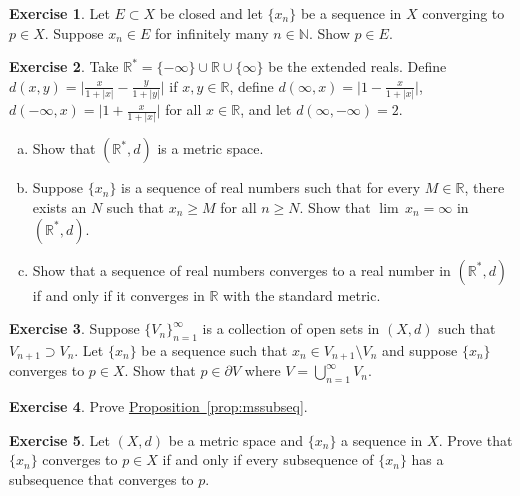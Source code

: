 \documentclass[12pt,openany]{book}
\newcommand{\abs}[1]{\left\lvert {#1} \right\rvert}
\newcommand{\R}{{\mathbb{R}}}
\newcommand{\N}{{\mathbb{N}}}
\theoremstyle{plain}
\theoremstyle{remark}
\theoremstyle{definition}
\newenvironment{exbox}{%
    \def\FrameCommand{\vrule width 1pt \relax\hspace{10pt}}%
    \MakeFramed{\advance\hsize-\width\FrameRestore}%
}{%
    \endMakeFramed
}
\newenvironment{exparts}{%
    \leavevmode\begin{enumerate}[a),noitemsep,topsep=0pt,parsep=0pt,partopsep=0pt]
}{%
    \end{enumerate}
}
\theoremstyle{exercise}
\newtheorem{exercise}{Exercise}[section]
\theoremstyle{example}
\newcommand{\propref}[1]{\hyperref[#1]{Proposition~\ref*{#1}}}
\begin{document}
\begin{exbox}
\begin{exercise}
Let $E \subset X$ be closed and
let $\{ x_n \}$ be a sequence in $X$ converging to $p \in X$.  Suppose
$x_n \in E$ for infinitely many $n \in \N$.  Show $p \in E$.
\end{exercise}

\begin{exercise} \label{exercise:extendedrealsmetric}
Take $\R^* = \{ -\infty \} \cup \R \cup \{ \infty \}$ be the extended reals.
Define $d(x,y) = \bigl\lvert \frac{x}{1+\abs{x}} - \frac{y}{1+\abs{y}}
\bigr\rvert$
if $x, y \in \R$,
define $d(\infty,x) = \bigl\lvert 1 - \frac{x}{1+\abs{x}} \bigr\rvert$,
$d(-\infty,x) = \bigl\lvert 1 + \frac{x}{1+\abs{x}} \bigr\rvert$
for all $x \in \R$, and
let $d(\infty,-\infty) = 2$.
\begin{exparts}
\item
Show that $(\R^*,d)$ is a metric space.
\item
Suppose $\{ x_n \}$ is a sequence of real numbers such that
for every $M \in \R$, there exists an $N$ such that
$x_n \geq M$ for all $n \geq N$.  Show that $\lim\, x_n = \infty$ in
$(\R^*,d)$.
\item
Show that a sequence of real numbers converges to a real number
in $(\R^*,d)$ if and
only if it converges in $\R$ with the standard metric.
\end{exparts}
\end{exercise}

\begin{exercise}
Suppose $\{ V_n \}_{n=1}^\infty$ is a collection of open sets
in $(X,d)$
such that $V_{n+1} \supset V_n$.  Let $\{ x_n \}$ be a sequence
such that $x_n \in V_{n+1} \setminus V_n$ and suppose 
$\{ x_n \}$ converges to $p \in X$.  Show that $p \in \partial V$
where $V = \bigcup_{n=1}^\infty V_n$.
\end{exercise}

\begin{exercise}
Prove \propref{prop:mssubseq}.
\end{exercise}

\begin{exercise}
Let $(X,d)$ be a metric space and $\{ x_n \}$ a sequence in $X$.
Prove that $\{ x_n \}$ converges to $p \in X$
if and only if
every subsequence of $\{ x_n \}$ has a subsequence that
converges to $p$.
\end{exercise}


\end{exbox}
\end{document}
